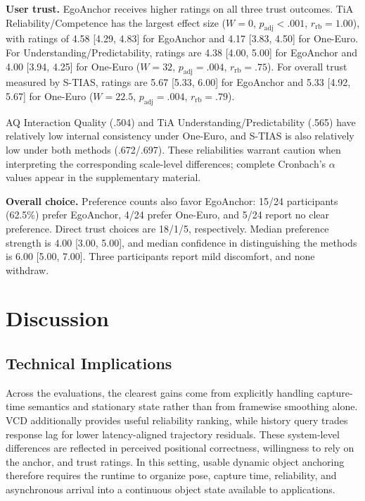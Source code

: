 \documentclass[review]{vgtc}
\begin{document}
\textbf{User trust.}
EgoAnchor receives higher ratings on all three trust outcomes. TiA Reliability/Competence has the largest effect size ($W=0$, $p_{\mathrm{adj}}<.001$, $r_{\mathrm{rb}}=1.00$), with ratings of 4.58 [4.29, 4.83] for EgoAnchor and 4.17 [3.83, 4.50] for One-Euro. For Understanding/Predictability, ratings are 4.38 [4.00, 5.00] for EgoAnchor and 4.00 [3.94, 4.25] for One-Euro ($W=32$, $p_{\mathrm{adj}}=.004$, $r_{\mathrm{rb}}=.75$). For overall trust measured by S-TIAS, ratings are 5.67 [5.33, 6.00] for EgoAnchor and 5.33 [4.92, 5.67] for One-Euro ($W=22.5$, $p_{\mathrm{adj}}=.004$, $r_{\mathrm{rb}}=.79$). 

AQ Interaction Quality (.504) and TiA Understanding/Predictability (.565) have relatively low internal consistency under One-Euro, and S-TIAS is also relatively low under both methods (.672/.697). These reliabilities warrant caution when interpreting the corresponding scale-level differences; complete Cronbach's $\alpha$ values appear in the supplementary material.

\textbf{Overall choice.}
Preference counts also favor EgoAnchor: 15/24 participants (62.5\%) prefer EgoAnchor, 4/24 prefer One-Euro, and 5/24 report no clear preference. Direct trust choices are 18/1/5, respectively. Median preference strength is 4.00 [3.00, 5.00], and median confidence in distinguishing the methods is 6.00 [5.00, 7.00]. Three participants report mild discomfort, and none withdraw.

\section{Discussion}\label{sec:discussion}

\subsection{Technical Implications}

Across the evaluations, the clearest gains come from explicitly handling capture-time semantics and stationary state rather than from framewise smoothing alone. VCD additionally provides useful reliability ranking, while history query trades response lag for lower latency-aligned trajectory residuals. These system-level differences are reflected in perceived positional correctness, willingness to rely on the anchor, and trust ratings. In this setting, usable dynamic object anchoring therefore requires the runtime to organize pose, capture time, reliability, and asynchronous arrival into a continuous object state available to applications.
\end{document}
